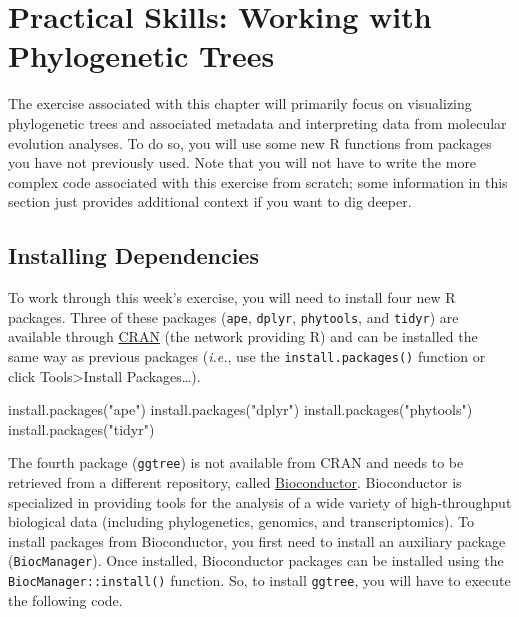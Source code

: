\documentclass[
]{book}
\newenvironment{Shaded}{\begin{snugshade}}{\end{snugshade}}
\newcommand{\AttributeTok}[1]{\textcolor[rgb]{0.77,0.63,0.00}{#1}}
\newcommand{\NormalTok}[1]{#1}
\newcommand{\StringTok}[1]{\textcolor[rgb]{0.31,0.60,0.02}{#1}}
\begin{document}
\hypertarget{practical-skills-working-with-phylogenetic-trees}{%
\section{Practical Skills: Working with Phylogenetic Trees}\label{practical-skills-working-with-phylogenetic-trees}}

The exercise associated with this chapter will primarily focus on visualizing phylogenetic trees and associated metadata and interpreting data from molecular evolution analyses. To do so, you will use some new R functions from packages you have not previously used. Note that you will not have to write the more complex code associated with this exercise from scratch; some information in this section just provides additional context if you want to dig deeper.

\hypertarget{installing-dependencies}{%
\subsection{Installing Dependencies}\label{installing-dependencies}}

To work through this week's exercise, you will need to install four new R packages. Three of these packages (\texttt{ape}, \texttt{dplyr}, \texttt{phytools}, and \texttt{tidyr}) are available through \href{https://cran.r-project.org/}{CRAN} (the network providing R) and can be installed the same way as previous packages (\emph{i.e.}, use the \texttt{install.packages()} function or click Tools\textgreater Install Packages\ldots).

\begin{Shaded}
\begin{Highlighting}[]
\NormalTok{install}\AttributeTok{.packages}\NormalTok{(}\StringTok{"ape"}\NormalTok{)}
\NormalTok{install}\AttributeTok{.packages}\NormalTok{(}\StringTok{"dplyr"}\NormalTok{)}
\NormalTok{install}\AttributeTok{.packages}\NormalTok{(}\StringTok{"phytools"}\NormalTok{)}
\NormalTok{install}\AttributeTok{.packages}\NormalTok{(}\StringTok{"tidyr"}\NormalTok{)}
\end{Highlighting}
\end{Shaded}

The fourth package (\texttt{ggtree}) is not available from CRAN and needs to be retrieved from a different repository, called \href{https://bioconductor.org/}{Bioconductor}. Bioconductor is specialized in providing tools for the analysis of a wide variety of high-throughput biological data (including phylogenetics, genomics, and transcriptomics). To install packages from Bioconductor, you first need to install an auxiliary package (\texttt{BiocManager}). Once installed, Bioconductor packages can be installed using the \texttt{BiocManager::install()} function. So, to install \texttt{ggtree}, you will have to execute the following code.
\end{document}
